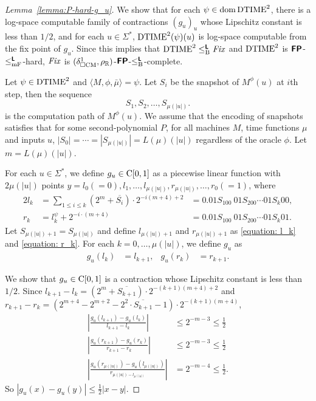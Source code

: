 \documentclass[envcountsame,orivec,oribibl]{llncs}
\begin{document}
\begin{proof}[Lemma~\ref{lemma:P-hard-g_u}]
 We show that for each $\psi \in \mathop{\rm dom} \mathrm{DTIME}^2$,
 there is a log-space computable family of contractions $(g_u)_u$ whose
 Lipschitz constant is less than $1/2$,
 and for each $u \in \Sigma^*$, $\mathrm{DTIME}^2(\psi)(u)$ is log-space 
 computable from the fix point of $g_u$.
 Since this implies that $\mathrm{DTIME}^2 \leq _{\mathrm B} ^{\text{\bfseries \sffamily \upshape L}} \mathit{Fix}$ and $\mathrm{DTIME}^2$
 is $\text{\bfseries \sffamily \upshape FP}$-$\leq _{\mathrm{mF}} ^{\text{\bfseries \sffamily \upshape L}}$-hard, $\mathit{Fix}$ is 
 $(\delta _{\square \mathrm{CM}}^1, \rho _\mathbb R)$-$\text{\bfseries \sffamily \upshape FP}$-$\leq _{\mathrm B} ^{\text{\bfseries \sffamily \upshape L}}$-complete.

 Let $\psi \in \mathrm{DTIME}^2$ and $\langle M, \phi, \bar \mu \rangle = \psi$.
 Let $S_i$ be the snapshot of $M^\phi(u)$ at $i$th step, then the sequence
 \begin{equation}
  S_1, S_2, \dots, S_{\mu(|u|)}.
 \end{equation}
 is the computation path of $M^\phi(u)$.
 We assume that the encoding of snapshots satisfies that 
 for some second-polynomial $P$, for all machines $M$, time functions $\mu$ 
 and inputs $u$, $|S_0| = \cdots = |S_{\mu(|u|)}| = L(\mu)(|u|)$
 regardless of the oracle $\phi$.
 Let $m = L(\mu)(|u|)$.


 For each $u \in \Sigma^*$, we define $g_u \in \mathrm C[0,1]$ as
 a piecewise linear function with $2\mu(|u|)$ points
 $y = l_0 (=0), l_1, \dots, l_{\mu(|u|)}, r_{\mu(|u|)}, \dots, r_0(=1)$,
 where
\begin{alignat}{2}
 \label{equation: l_k}
 l_k 
 &
 = \sum_{1 \le i \le k} (2^m+\overline{S_i}) \cdot 2^{-i(m+4)+2} 
 &
 = 0.01S_100\ 01S_200 \cdots 01S_k00,
 \\
 \label{equation: r_k}
 r_k
 &
 = l^\psi_k + 2^{-i \cdot (m+4)}
 &
 = 0.01S_100\ 01S_200 \cdots 01S_k01.
\end{alignat}
 Let $S_{\mu(|u|)+1} = S_{\mu(|u|)}$ and
 define $l_{\mu(|u|)+1}$ and $r_{\mu(|u|)+1}$ as
 \eqref{equation: l_k} and \eqref{equation: r_k}.
 For each $k = 0, \dots, \mu(|u|)$,
 we define $g_u$ as
 \begin{align}
 g_u(l_k) &= l_{k+1},
 &
 g_u(r_k) &= r_{k+1}.
 \end{align}

 We show that $g_u \in \mathrm C[0,1]$ is a contraction whose Lipschitz constant
 is less than $1/2$.
 Since $l_{k+1} - l_{k} = (2^m+\overline{S_{k+1}}) \cdot 2^{-(k+1)(m+4)+2} $
 and $r_{k+1} - r_{k} = (2^{m+4} - 2^{m+2} - 2^2 \cdot \overline{S_{k+1}} - 1)
 \cdot 2^{-(k+1)(m+4)} $,
\begin{align}
 \left|\frac{g_u(l_{k+1}) - g_u(l_k)}{l_{k+1} - l_k} \right| 
 &
 \le 2^{-m-3} \le \frac 1 2
 \\
 \left|\frac{g_u(r_{k+1}) - g_u(r_k)}{r_{k+1} - r_k} \right| 
 &
 \le 2^{-m-3} \le \frac 1 2
 \\
 \left|\frac{g_u(r_{\mu(|u|)}) - g_u(l_{\mu(|u|)})}{r_{\mu(|u|) - l_{\mu(|u|)}}} \right| 
 &
 = 2^{-m-4} \le \frac 1 2.
\end{align}
 So $|g_u(x) - g_u(y)| \le \frac 1 2 |x-y|$.


\end{proof}
\end{document}
